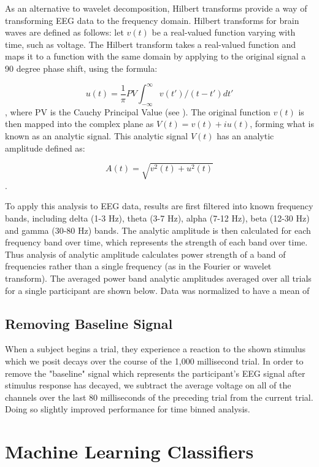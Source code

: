 \documentclass[12pt]{report}
\begin{document}
	
	As an alternative to wavelet decomposition, Hilbert transforms provide a way of transforming EEG data to the frequency domain.  Hilbert transforms for brain waves are defined as follows\cite{Freeman}:  let $v(t)$ be a real-valued function varying with time, such as voltage.  The Hilbert transform takes a real-valued function and maps it to a function with the same domain by applying to the original signal a 90 degree phase shift, using the formula:
	
	$$
		u(t) =  \frac{1}{\pi} PV \int_{-\infty}^{\infty} v(t')/(t-t')dt'
	$$
	, where PV is the Cauchy Principal Value (see \cite{cpv}).  The original function $v(t)$ is then mapped into the complex plane as $V(t) = v(t) + iu(t)$, forming what is known as an analytic signal.  This analytic signal $V(t)$ has an analytic amplitude defined as: 
	
	$$
		A(t) = \sqrt{v^2(t) + u^2(t)}
	$$.
	
	 
	To apply this analysis to EEG data, results are first filtered into known frequency bands, including delta (1-3 Hz), theta (3-7 Hz), alpha (7-12 Hz), beta (12-30 Hz) and gamma (30-80 Hz)\cite{Freeman} bands.  The analytic amplitude is then calculated for each frequency band over time, which represents the strength of each band over time.  Thus analysis of analytic amplitude calculates power strength of a band of frequencies rather than a single frequency (as in the Fourier or wavelet transform).  The averaged power band analytic amplitudes averaged over all trials for a single participant are shown below.  Data was normalized to have a mean of 
	
	
	
	
\subsection{Removing Baseline Signal}
	When a subject begins a trial, they experience a reaction to the shown stimulus which we posit decays over the course of the 1,000 millisecond trial.  In order to remove the "baseline" signal which represents the participant's EEG signal after stimulus response has decayed, we subtract the average voltage on all of the channels over the last 80 milliseconds of the preceding trial from the current trial.  Doing so slightly improved performance for time binned analysis.
	
\section{Machine Learning Classifiers}
\end{document}
